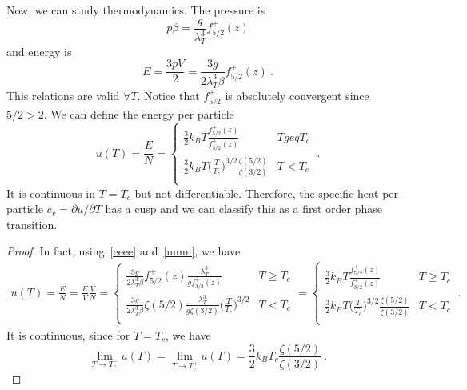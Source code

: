     Now, we can study thermodynamics. The pressure is 
    \begin{equation*}
        p \beta = \frac{g}{\lambda_T^3} f^+_{5/2} (z) 
    \end{equation*}
    and energy is
    \begin{equation}\label{eeee}
        E = \frac{3pV}{2} = \frac{3 g}{2 \lambda_T^3 \beta} f^+_{5/2} (z) ~.
    \end{equation} 
    This relations are valid $\forall T$. Notice that $f^+_{5/2}$ is absolutely convergent since $5/2 > 2$. We can define the energy per particle 
    \begin{equation*}
        u(T) = \frac{E}{N} = \begin{cases}
            \frac{3}{2} k_B T \frac{f^+_{5/2} (z)}{f^+_{3/2} (z)} & T geq T_c \\
            \frac{3}{2} k_B T \Big ( \frac{T}{T_c} \Big)^{3/2} \frac{\zeta(5/2)}{\zeta(3/2)} & T < T_c \\
        \end{cases} ~.
    \end{equation*}
    It is continuous in $T=T_c$ but not differentiable. Therefore, the specific heat per particle $c_v = \partial u / \partial T$ has a cusp and we can classify this as a first order phase transition.
    \begin{proof}
        In fact, using~\eqref{eeee} and~\eqref{nnnn}, we have 
        \begin{equation*}
        \begin{aligned}
            u(T) = \frac{E}{N} = \frac{E}{V} \frac{V}{N} = \begin{cases}
                \frac{3 g}{2 \lambda_T^3 \beta} f^+_{5/2} (z)  \frac{\lambda_T^3}{g f^+_{3/2} (z)} & T \geq T_c \\
                \frac{3 g}{2 \lambda_T^3 \beta} \zeta(5/2) \frac{\lambda_T^3}{g \zeta(3/2)} \Big ( \frac{T}{T_c} \Big )^{3/2} & T < T_c \\
            \end{cases} = \begin{cases}
                \frac{3}{2} k_B T \frac{f^+_{5/2} (z)}{f^+_{3/2} (z)} & T \geq T_c \\
                \frac{3}{2} k_B T \Big ( \frac{T}{T_c} \Big)^{3/2} \frac{\zeta(5/2)}{\zeta(3/2)} & T < T_c \\
            \end{cases} ~.
        \end{aligned}
        \end{equation*}
        It is continuous, since for $T = T_c$, we have
        \begin{equation*}
            \lim_{T \rightarrow T_c^-} u(T) = \lim_{T \rightarrow T_c^+} u(T) = \frac{3}{2} k_B T_c \frac{\zeta(5/2)}{\zeta(3/2)} ~.
        \end{equation*}
    \end{proof}
